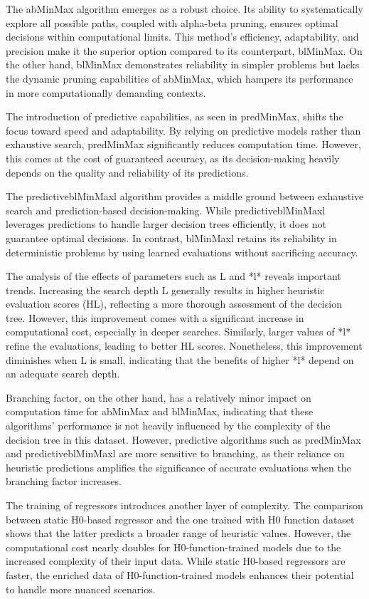 \documentclass[10pt, letterpaper]{article}
\begin{document}
The abMinMax algorithm emerges as a robust choice. Its ability to systematically explore all possible paths, coupled with alpha-beta pruning, ensures optimal decisions within computational limits. This method's efficiency, adaptability, and precision make it the superior option compared to its counterpart, blMinMax. On the other hand, blMinMax demonstrates reliability in simpler problems but lacks the dynamic pruning capabilities of abMinMax, which hampers its performance in more computationally demanding contexts.

The introduction of predictive capabilities, as seen in predMinMax, shifts the focus toward speed and adaptability. By relying on predictive models rather than exhaustive search, predMinMax significantly reduces computation time. However, this comes at the cost of guaranteed accuracy, as its decision-making heavily depends on the quality and reliability of its predictions.

The predictiveblMinMaxl algorithm provides a middle ground between exhaustive search and prediction-based decision-making. While predictiveblMinMaxl leverages predictions to handle larger decision trees efficiently, it does not guarantee optimal decisions. In contrast, blMinMaxl retains its reliability in deterministic problems by using learned evaluations without sacrificing accuracy.

The analysis of the effects of parameters such as L and *l* reveals important trends. Increasing the search depth L generally results in higher heuristic evaluation scores (HL), reflecting a more thorough assessment of the decision tree. However, this improvement comes with a significant increase in computational cost, especially in deeper searches. Similarly, larger values of *l* refine the evaluations, leading to better HL scores. Nonetheless, this improvement diminishes when L is small, indicating that the benefits of higher *l* depend on an adequate search depth.

Branching factor, on the other hand, has a relatively minor impact on computation time for abMinMax and blMinMax, indicating that these algorithms' performance is not heavily influenced by the complexity of the decision tree in this dataset. However, predictive algorithms such as predMinMax and predictiveblMinMaxl are more sensitive to branching, as their reliance on heuristic predictions amplifies the significance of accurate evaluations when the branching factor increases.

The training of regressors introduces another layer of complexity. The comparison between static H0-based regressor and the one trained with H0 function dataset shows that the latter predicts a broader range of heuristic values. However, the computational cost nearly doubles for H0-function-trained models due to the increased complexity of their input data. While static H0-based regressors are faster, the enriched data of H0-function-trained models enhances their potential to handle more nuanced scenarios.
\end{document}
